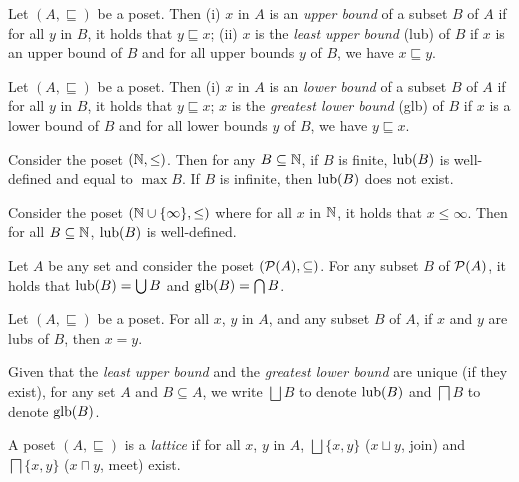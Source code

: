 \begin{definition}
    Let $(A,\sqsubseteq)$ be a poset. Then (i) $x$ in $A$ is an \emph{upper bound} of a subset $B$ of $A$ if for all $y$ in $B$, it holds that $y \sqsubseteq x$;
    (ii) $x$ is the \emph{least upper bound} (lub) of $B$ if $x$ is an upper bound of $B$ and for all upper bounds $y$ of $B$, we have $x \sqsubseteq y$. %
\end{definition}

\begin{definition}
    Let $(A,\sqsubseteq)$ be a poset. Then (i) $x$ in $A$ is an \emph{lower bound} of a subset $B$ of $A$ if for all $y$ in $B$, it holds that $y \sqsubseteq x$; $x$ is the \emph{greatest lower bound} (glb) of $B$ if $x$ is a lower bound of $B$ and for all lower bounds $y$ of $B$, we have $y \sqsubseteq x$. %
\end{definition}

\begin{example}
    Consider the poset $(\mathbb{N},\leq)$. Then for any $B \subseteq \mathbb{N}$, if $B$ is finite, $\operatorname{lub}(B)$ is well-defined and equal to $\max B$. If $B$ is infinite, then $\operatorname{lub}(B)$ does not exist.
\end{example}

\begin{example}
   Consider the poset $(\mathbb{N} \cup \{\infty\},\leq)$ where for all $x$ in $\mathbb{N}$, it holds that $x \leq \infty$. Then for all $B \subseteq \mathbb{N}$, $\operatorname{lub}(B)$ is well-defined.
\end{example}

\begin{example}
    Let $A$ be any set and consider the poset $(\mathcal{P}(A),\subseteq)$. For any subset $B$ of $\mathcal{P}(A)$, it holds that $\operatorname{lub}(B) = \bigcup B$ and $\operatorname{glb}(B) = \bigcap B$.
\end{example}

\begin{lemma}
  Let $(A,\sqsubseteq)$ be a poset. For all $x$, $y$ in $A$, and any subset $B$ of $A$, if $x$ and $y$ are lubs of $B$, then $x = y$.
\end{lemma}

Given that the \emph{least upper bound} and the \emph{greatest lower bound} are unique (if they exist), for any set $A$ and $B \subseteq A$, we write $\bigsqcup B$ to denote $\operatorname{lub}(B)$ and $\bigsqcap B$ to denote $\operatorname{glb}(B)$.

\begin{definition}[Lattice]
    A poset $(A,\sqsubseteq)$ is a \emph{lattice} if for all $x$, $y$ in $A$, $\bigsqcup \{x,y\}$ ($x \sqcup y$, join) and $\bigsqcap \{x,y\}$ ($x \sqcap y$, meet) exist.
\end{definition}

